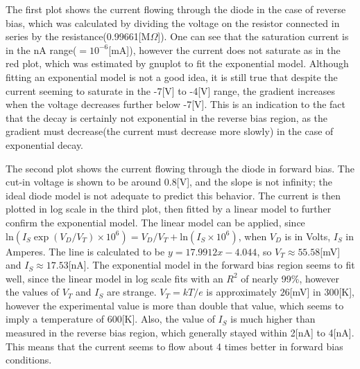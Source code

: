 \documentclass[a4paper, itemph]{oblivoir}
\theoremstyle{definition}
\begin{document}
\begin{center}
{
}
\end{center}

The first plot shows the current flowing through the diode in the case of reverse bias, which was calculated by dividing the voltage on the resistor connected in series by the resistance(0.99661[M$\Omega$]). One can see that the saturation current is in the nA range($=10^{-6}$[mA]), however the current does not saturate as in the red plot, which was estimated by gnuplot to fit the exponential model. Although fitting an exponential model is not a good idea, it is still true that despite the current seeming to saturate in the -7[V] to -4[V] range, the gradient increases when the voltage decreases further below -7[V]. This is an indication to the fact that the decay is certainly not exponential in the reverse bias region, as the gradient must decrease(the current must decrease more slowly) in the case of exponential decay.

The second plot shows the current flowing through the diode in forward bias. The cut-in voltage is shown to be around 0.8[V], and the slope is not infinity; the ideal diode model is not adequate to predict this behavior. The current is then plotted in log scale in the third plot, then fitted by a linear model to further confirm the exponential model. The linear model can be applied, since $\mathrm{ln}(I_S\exp(V_D/V_T)\times10^6)=V_D/V_T+\mathrm{ln}(I_S\times10^6)$, when $V_D$ is in Volts, $I_S$ in Amperes. The line is calculated to be $y=17.9912x-4.044$, so $V_T\approx 55.58$[mV] and $I_S\approx 17.53$[nA]. The exponential model in the forward bias region seems to fit well, since the linear model in log scale fits with an $R^2$ of nearly 99\%, however the values of $V_T$ and $I_S$ are strange. $V_T=kT/e$ is approximately $26$[mV] in 300[K], however the experimental value is more than double that value, which seems to imply a temperature of 600[K]. Also, the value of $I_S$ is much higher than measured in the reverse bias region, which generally stayed within 2[nA] to 4[nA]. This means that the current seems to flow about 4 times better in forward bias conditions. 
\end{document}
